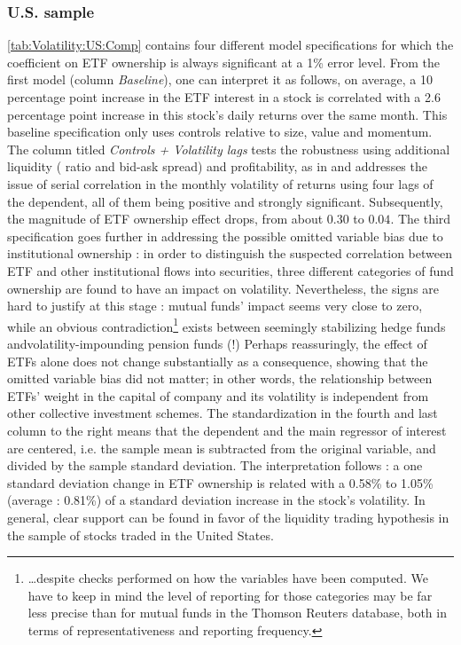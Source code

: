\subsubsection{U.S. sample}
\autoref{tab:Volatility:US:Comp} contains four different model specifications for which the coefficient on ETF ownership is always significant at a 1\% error level. From the first model (column \textit{Baseline}), one can interpret it as follows, on average, a 10 percentage point increase in the ETF interest in a stock is correlated with a 2.6 percentage point increase in this stock's daily returns over the same month. This baseline specification only uses controls relative to size, value and momentum. The column titled \textit{Controls + Volatility lags} tests the robustness using additional liquidity (\textcite{Amihud2002} ratio and bid-ask spread) and profitability, as in \textcite{Ben-David2018} and addresses the issue of serial correlation in the monthly volatility of returns using four lags of the dependent, all of them being positive and strongly significant. Subsequently, the magnitude of ETF ownership effect drops, from about $0.30$ to $0.04$. The third specification goes further in addressing the possible omitted variable bias due to institutional ownership : in order to distinguish the suspected correlation between ETF and other institutional flows into securities, three different categories of fund ownership are found to have an impact on volatility. Nevertheless, the signs are hard to justify at this stage : mutual funds' impact seems very close to zero, while an obvious contradiction\footnote{\dots despite checks performed on how the variables have been computed. We have to keep in mind the level of reporting for those categories may be far less precise than for mutual funds in the Thomson Reuters database, both in terms of representativeness and reporting frequency.} exists between seemingly stabilizing hedge funds andvolatility-impounding pension funds (!) Perhaps reassuringly, the effect of ETFs alone does not change substantially as a consequence, showing that the omitted variable bias did not matter; in other words, the relationship between ETFs' weight in the capital of company and its volatility is independent from other collective investment schemes. The standardization in the fourth and last column to the right means that the dependent and the main regressor of interest are centered, i.e. the sample mean is subtracted from the original variable, and divided by the sample standard deviation. The interpretation follows : a one standard deviation change in ETF ownership is related with a 0.58\% to 1.05\% (average : 0.81\%) of a standard deviation increase in the stock's volatility. In general, clear support can be found in favor of the liquidity trading hypothesis in the sample of stocks traded in the United States.

